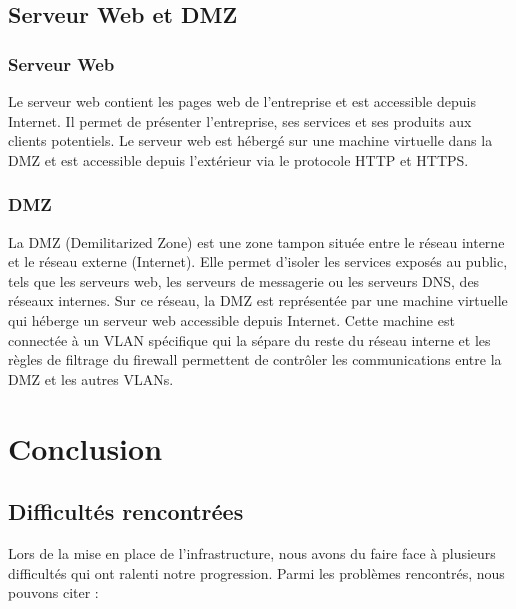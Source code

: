 \documentclass[a4paper,12pt]{report}
\begin{document}
        \section{Serveur Web et DMZ}
            \subsection{Serveur Web}
                Le serveur web contient les pages web de l'entreprise et est accessible depuis Internet. Il permet de présenter l'entreprise, ses services et ses produits aux clients potentiels. Le serveur web est hébergé sur une machine virtuelle dans la DMZ et est accessible depuis l'extérieur via le protocole HTTP et HTTPS.
            \subsection{DMZ}
                La DMZ (Demilitarized Zone) est une zone tampon située entre le réseau interne et le réseau externe (Internet). Elle permet d'isoler les services exposés au public, tels que les serveurs web, les serveurs de messagerie ou les serveurs DNS, des réseaux internes. Sur ce réseau, la DMZ est représentée par une machine virtuelle qui héberge un serveur web accessible depuis Internet. Cette machine est connectée à un VLAN spécifique qui la sépare du reste du réseau interne et les règles de filtrage du firewall permettent de contrôler les communications entre la DMZ et les autres VLANs.
    \chapter{Conclusion}
        \section{Difficultés rencontrées}

            Lors de la mise en place de l'infrastructure, nous avons du faire face à plusieurs difficultés qui ont ralenti notre progression. Parmi les problèmes rencontrés, nous pouvons citer :
\end{document}
